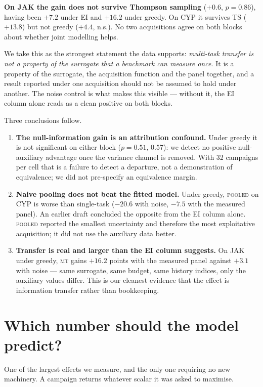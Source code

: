 \documentclass[11pt]{article}
\newcommand{\mt}{\textsc{mt}}
\newcommand{\pooled}{\textsc{pooled}}
\begin{document}
\textbf{On JAK the gain does not survive Thompson sampling} ($+0.6$, $p=0.86$),
having been $+7.2$ under EI and $+16.2$ under greedy. On CYP it survives TS
($+13.8$) but not greedy ($+4.4$, n.s.). No two acquisitions agree on both
blocks about whether joint modelling helps.

We take this as the strongest statement the data supports: \emph{multi-task
transfer is not a property of the surrogate that a benchmark can measure once.}
It is a property of the surrogate, the acquisition function and the panel
together, and a result reported under one acquisition should not be assumed to
hold under another. The noise control is what makes this visible ---
without it, the EI column alone reads as a clean positive on both blocks.

Three conclusions follow.

\begin{enumerate}[leftmargin=1.6em,itemsep=0.25em]
  \item \textbf{The null-information gain is an attribution confound.} Under greedy it is
    not significant on either block ($p = 0.51$, $0.57$): we detect no positive
    null-auxiliary advantage once the variance channel is removed. With 32 campaigns
    per cell that is a failure to detect a departure, not a demonstration of
    equivalence; we did not pre-specify an equivalence margin.
  \item \textbf{Naive pooling does not beat the fitted model.} Under greedy,
    \pooled{} on CYP is worse than single-task ($-20.6$ with noise, $-7.5$ with
    the measured panel). An earlier draft concluded the opposite from the EI
    column alone. \pooled{} reported the smallest uncertainty and therefore the
    most exploitative acquisition; it did not use the auxiliary data better.
  \item \textbf{Transfer is real and larger than the EI column suggests.} On JAK
    under greedy, \mt{} gains $+16.2$ points with the measured panel against
    $+3.1$ with noise --- same surrogate, same budget, same history indices,
    only the auxiliary values differ. This is our cleanest evidence that the
    effect is information transfer rather than bookkeeping.
\end{enumerate}


\section{Which number should the model predict?}

One of the largest effects we measure, and the only one requiring no new
machinery. A
campaign returns whatever scalar it was asked to maximise.
\end{document}
